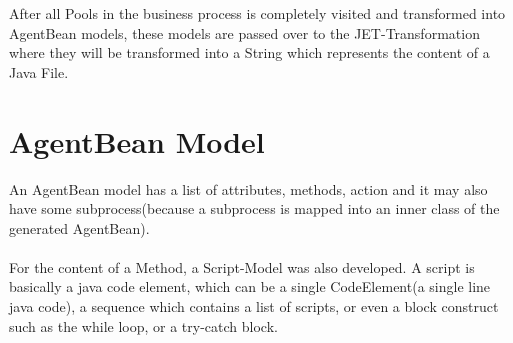 After all Pools in the business process is completely visited and transformed into AgentBean models, these models are passed over to the JET-Transformation where they will be transformed into a String which represents the content of a Java File. 

\section{AgentBean Model}

An AgentBean model has a list of attributes, methods, action and it may also have some subprocess(because a subprocess is mapped into an inner class of the generated AgentBean).\\\\
For the content of a Method, a Script-Model was also developed. A script is basically a java code element, which can be a single CodeElement(a single line java code), a sequence which contains a list of scripts, or even a block construct such as the while loop, or a try-catch block. 

